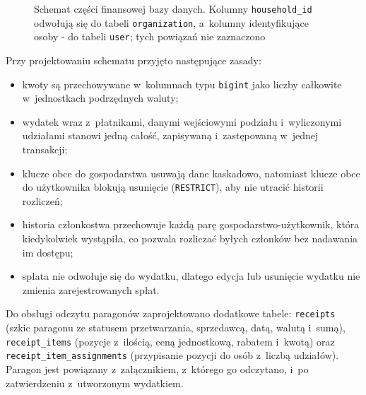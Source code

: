 \begin{figure}[H]
{%
  }
  \caption{Schemat części finansowej bazy danych. Kolumny \texttt{household\_id} odwołują się do tabeli \texttt{organization}, a~kolumny identyfikujące osoby - do tabeli \texttt{user}; tych powiązań nie zaznaczono}
  \label{fig:erd}
\end{figure}

Przy projektowaniu schematu przyjęto następujące zasady:

\begin{itemize}
  \item kwoty są przechowywane w~kolumnach typu \texttt{bigint} jako liczby całkowite w~jednostkach podrzędnych waluty;
  \item wydatek wraz z~płatnikami, danymi wejściowymi podziału i~wyliczonymi udziałami stanowi jedną całość, zapisywaną i~zastępowaną w~jednej transakcji;
  \item klucze obce do gospodarstwa usuwają dane kaskadowo, natomiast klucze obce do użytkownika blokują usunięcie (\texttt{RESTRICT}), aby nie utracić historii rozliczeń;
  \item historia członkostwa przechowuje każdą parę gospodarstwo-użytkownik, która kiedykolwiek wystąpiła, co pozwala rozliczać byłych członków bez nadawania im dostępu;
  \item spłata nie odwołuje się do wydatku, dlatego edycja lub usunięcie wydatku nie zmienia zarejestrowanych spłat.
\end{itemize}

Do obsługi odczytu paragonów zaprojektowano dodatkowe tabele: \texttt{receipts} (szkic paragonu ze statusem przetwarzania, sprzedawcą, datą, walutą i~sumą), \texttt{receipt\_items} (pozycje z~ilością, ceną jednostkową, rabatem i~kwotą) oraz \texttt{receipt\_item\_assignments} (przypisanie pozycji do osób z~liczbą udziałów). Paragon jest powiązany z~załącznikiem, z~którego go odczytano, i~po zatwierdzeniu z~utworzonym wydatkiem.

